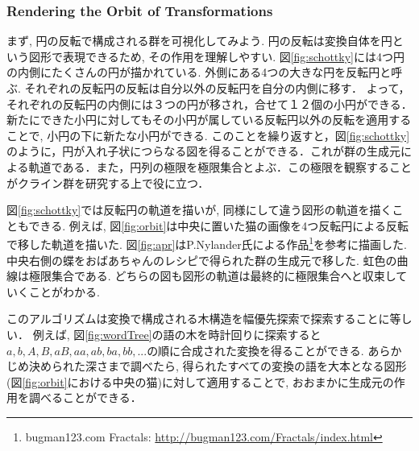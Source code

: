\subsubsection{Rendering the Orbit of Transformations}

まず, 円の反転で構成される群を可視化してみよう.
円の反転は変換自体を円という図形で表現できるため, その作用を理解しやすい.
図\ref{fig:schottky}には4つ円の内側にたくさんの円が描かれている.
外側にある4つの大きな円を反転円と呼ぶ.
それぞれの反転円の反転は自分以外の反転円を自分の内側に移す．
よって，それぞれの反転円の内側には３つの円が移され，合せて１２個の小円ができる．
新たにできた小円に対してもその小円が属している反転円以外の反転を適用することで, 小円の下に新たな小円ができる.
このことを繰り返すと，図\ref{fig:schottky}のように，円が入れ子状につらなる図を得ることができる．これが群の生成元による軌道である．また，円列の極限を極限集合とよぶ．この極限を観察することがクライン群を研究する上で役に立つ．

図\ref{fig:schottky}では反転円の軌道を描いが, 同様にして違う図形の軌道を描くこともできる.
例えば, 図\ref{fig:orbit}は中央に置いた猫の画像を4つ反転円による反転で移した軌道を描いた.
図\ref{fig:apr}はP.Nylander氏による作品\footnote{bugman123.com Fractals: \url{http://bugman123.com/Fractals/index.html}}を参考に描画した.
中央右側の蝶をおばあちゃんのレシピで得られた群の生成元で移した.
虹色の曲線は極限集合である.
どちらの図も図形の軌道は最終的に極限集合へと収束していくことがわかる.

このアルゴリズムは変換で構成される木構造を幅優先探索で探索することに等しい．
例えば, 図\ref{fig:wordTree}の語の木を時計回りに探索すると$ a, b, A, B, aB, aa, ab, ba, bb, ...$の順に合成された変換を得ることができる.
あらかじめ決められた深さまで調べたら, 得られたすべての変換の語を大本となる図形(図\ref{fig:orbit}における中央の猫)に対して適用することで, おおまかに生成元の作用を調べることができる．


